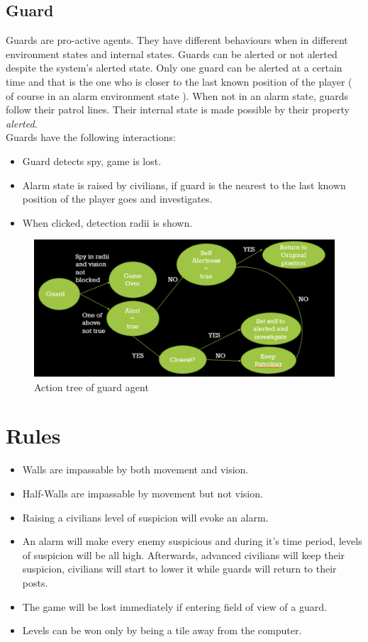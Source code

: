 \documentclass[12pt]{article}
\begin{document}
\subsection{Guard}
Guards are pro-active agents. They have different behaviours when in different environment states and internal states. Guards can be alerted or not alerted despite the system's alerted state. Only one guard can be alerted at a certain time and that is the one who is closer to the last known position of the player ( of course in an alarm environment state ). When not in an alarm state, guards follow their patrol lines. Their internal state is made possible by their property \emph{alerted}.\\
Guards have the following interactions:
\begin{itemize}
\item Guard detects spy, game is lost.
\item Alarm state is raised by civilians, if guard is the nearest to the last known position of the player goes and investigates.
\item When clicked, detection radii is shown.
\end{itemize}
\begin{figure}[h]
\includegraphics[scale=.7]{Picture9.png}
\centering
\caption{Action tree of guard agent}
\end{figure}
\newpage
\section{Rules}
\begin{itemize}
\item Walls are impassable by both movement and vision.
\item Half-Walls are impassable by movement but not vision.
\item Raising a civilians level of suspicion will evoke an alarm.
\item An alarm will make every enemy suspicious and during it’s time period, levels of suspicion will be all high. Afterwards, advanced civilians will keep their suspicion, civilians will start to lower it while guards will return to their posts.
\item The game will be lost immediately if entering field of view of a guard.
\item Levels can be won only by being a tile away from the computer.
\end{itemize}
\end{document}
